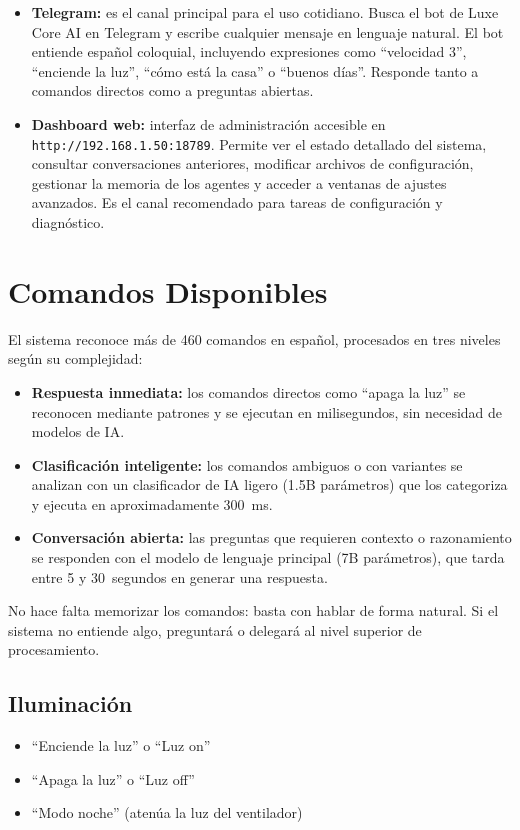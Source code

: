 \begin{itemize}
    \item \textbf{Telegram:} es el canal principal para el uso cotidiano. Busca el bot de Luxe Core AI en Telegram y escribe cualquier mensaje en lenguaje natural. El bot entiende español coloquial, incluyendo expresiones como ``velocidad 3'', ``enciende la luz'', ``cómo está la casa'' o ``buenos días''. Responde tanto a comandos directos como a preguntas abiertas.
    \item \textbf{Dashboard web:} interfaz de administración accesible en \texttt{http://192.168.1.50:18789}. Permite ver el estado detallado del sistema, consultar conversaciones anteriores, modificar archivos de configuración, gestionar la memoria de los agentes y acceder a ventanas de ajustes avanzados. Es el canal recomendado para tareas de configuración y diagnóstico.
\end{itemize}

\section{Comandos Disponibles}

El sistema reconoce más de 460 comandos en español, procesados en tres niveles según su complejidad:

\begin{itemize}
    \item \textbf{Respuesta inmediata:} los comandos directos como ``apaga la luz'' se reconocen mediante patrones y se ejecutan en milisegundos, sin necesidad de modelos de IA.
    \item \textbf{Clasificación inteligente:} los comandos ambiguos o con variantes se analizan con un clasificador de IA ligero (1.5B parámetros) que los categoriza y ejecuta en aproximadamente 300~ms.
    \item \textbf{Conversación abierta:} las preguntas que requieren contexto o razonamiento se responden con el modelo de lenguaje principal (7B parámetros), que tarda entre 5 y 30~segundos en generar una respuesta.
\end{itemize}

No hace falta memorizar los comandos: basta con hablar de forma natural. Si el sistema no entiende algo, preguntará o delegará al nivel superior de procesamiento.

\subsection{Iluminación}
\begin{itemize}
    \item ``Enciende la luz'' o ``Luz on''
    \item ``Apaga la luz'' o ``Luz off''
    \item ``Modo noche'' (atenúa la luz del ventilador)
\end{itemize}

